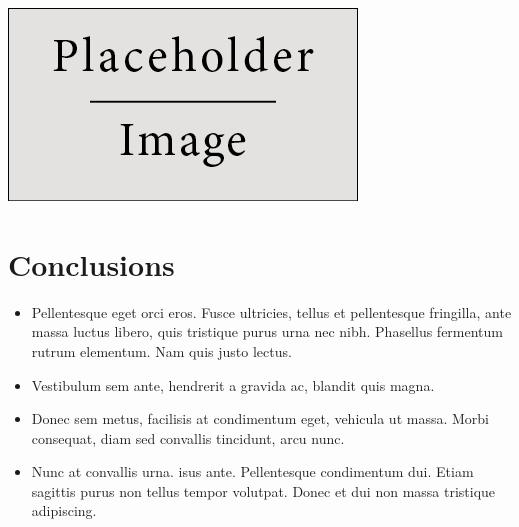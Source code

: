 \documentclass[a0,landscape]{a0poster}
\begin{document}
\begin{multicols}{4}
\begin{center}\vspace{1cm}
\includegraphics[width=0.8\linewidth]{placeholder}
\end{center}\vspace{1cm}


\color{SaddleBrown} %

\section*{Conclusions}

\begin{itemize}
\item Pellentesque eget orci eros. Fusce ultricies, tellus et pellentesque fringilla, ante massa luctus libero, quis tristique purus urna nec nibh. Phasellus fermentum rutrum elementum. Nam quis justo lectus.
\item Vestibulum sem ante, hendrerit a gravida ac, blandit quis magna.
\item Donec sem metus, facilisis at condimentum eget, vehicula ut massa. Morbi consequat, diam sed convallis tincidunt, arcu nunc.
\item Nunc at convallis urna. isus ante. Pellentesque condimentum dui. Etiam sagittis purus non tellus tempor volutpat. Donec et dui non massa tristique adipiscing.
\end{itemize}

\color{DarkSlateGray} %



\end{multicols}
\end{document}
